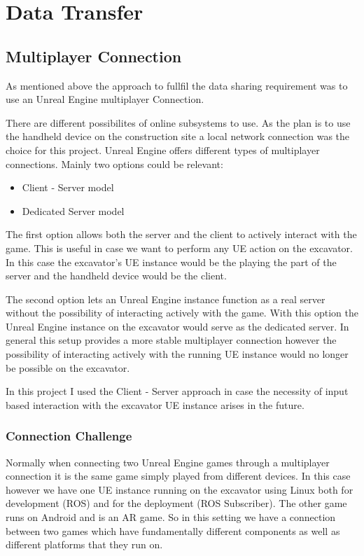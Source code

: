 \chapter*{Data Transfer}\label{ch:data_transfer}

\section*{Multiplayer Connection}\label{sec:multiplayer}

As mentioned above the approach to fullfil the data sharing requirement was to use an Unreal Engine multiplayer Connection.

There are different possibilites of online subsystems to use. As the plan is to use the handheld device on the construction site a local network connection was the choice for this project. Unreal Engine offers different types of multiplayer connections. Mainly two options could be relevant:
\begin{itemize}
    \item Client - Server model
    \item Dedicated Server model
\end{itemize}

The first option allows both the server and the client to actively interact with the game. This is useful in case we want to perform any UE action on the excavator. In this case the excavator's UE instance would be the playing the part of the server and the handheld device would be the client. 

The second option lets an Unreal Engine instance function as a real server without the possibility of interacting actively with the game. With this option the Unreal Engine instance on the excavator would serve as the dedicated server. In general this setup provides a more stable multiplayer connection however the possibility of interacting actively with the running UE instance would no longer be possible on the excavator.

In this project I used the Client - Server approach in case the necessity of input based interaction with the excavator UE instance arises in the future.

\subsection*{Connection Challenge}\label{subsec:key}

Normally when connecting two Unreal Engine games through a multiplayer connection it is the same game simply played from different devices. In this case however we have one UE instance running on the excavator using Linux both for development (ROS) and for the deployment (ROS Subscriber). The other game runs on Android and is an AR game. So in this setting we have a connection between two games which have fundamentally different components as well as different platforms that they run on. 

